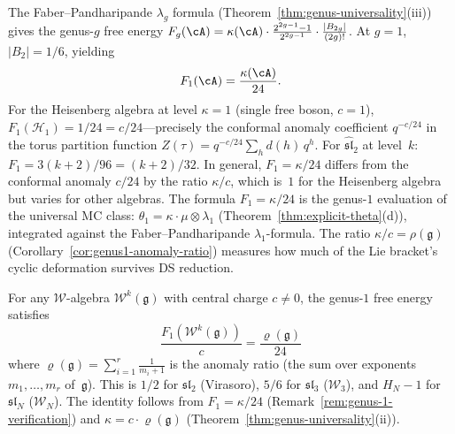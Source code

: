 \begin{remark}\label{rem:genus-1-verification}
The Faber--Pandharipande $\lambda_g$ formula (Theorem~\ref{thm:genus-universality}(iii))
gives the genus-$g$ free energy
$F_g(\cA) = \kappa(\cA) \cdot \frac{2^{2g-1}-1}{2^{2g-1}} \cdot \frac{|B_{2g}|}{(2g)!}$.
At $g = 1$, $|B_2| = 1/6$, yielding
\[
F_1(\cA) = \frac{\kappa(\cA)}{24}.
\]
For the Heisenberg algebra at level $\kappa = 1$ (single free boson, $c = 1$),
$F_1(\mathcal{H}_1) = 1/24 = c/24$---precisely the conformal anomaly coefficient
$q^{-c/24}$ in the torus partition function $Z(\tau) = q^{-c/24}\sum_h d(h)\,q^h$.
For $\widehat{\mathfrak{sl}}_2$ at level~$k$:
$F_1 = 3(k{+}2)/96 = (k{+}2)/32$.
In general, $F_1 = \kappa/24$ differs from the conformal anomaly $c/24$ by the ratio $\kappa/c$, which is~$1$ for the Heisenberg algebra but varies for other algebras.
The formula $F_1 = \kappa/24$ is the genus-$1$ evaluation
of the universal MC class: $\theta_1 = \kappa \cdot \mu
\otimes \lambda_1$
(Theorem~\ref{thm:explicit-theta}(d)), integrated
against the Faber--Pandharipande $\lambda_1$-formula.
The ratio $\kappa/c = \rho(\mathfrak{g})$
(Corollary~\ref{cor:genus1-anomaly-ratio}) measures
how much of the Lie bracket's cyclic deformation
survives DS reduction.
\end{remark}

\begin{corollary}
\label{cor:genus1-anomaly-ratio}
For any $\mathcal{W}$-algebra $\mathcal{W}^k(\mathfrak{g})$ with central charge $c \neq 0$, the genus-$1$ free energy satisfies
\begin{equation}\label{eq:F1-over-c}
\frac{F_1(\mathcal{W}^k(\mathfrak{g}))}{c} = \frac{\varrho(\mathfrak{g})}{24}
\end{equation}
where $\varrho(\mathfrak{g}) = \sum_{i=1}^r \frac{1}{m_i+1}$ is the anomaly ratio (the sum over exponents $m_1, \ldots, m_r$ of~$\mathfrak{g}$).  This is $1/2$ for $\mathfrak{sl}_2$ (Virasoro), $5/6$ for $\mathfrak{sl}_3$ ($\mathcal{W}_3$), and $H_N - 1$ for $\mathfrak{sl}_N$ ($\mathcal{W}_N$).  The identity follows from $F_1 = \kappa/24$ (Remark~\ref{rem:genus-1-verification}) and $\kappa = c \cdot \varrho(\mathfrak{g})$ (Theorem~\ref{thm:genus-universality}\textup{(ii)}).
\end{corollary}

